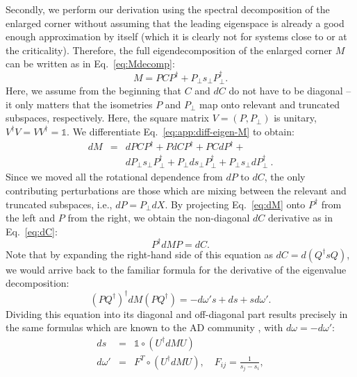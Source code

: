 \documentclass[twocolumn,floatfix,superscriptaddress,longbibliography,pra]{revtex4-2}
\begin{document}
Secondly, we perform our derivation using the spectral decomposition of the enlarged corner without assuming that the leading eigenspace is already a good enough approximation by itself (which it is clearly not for systems close to or at the criticality). Therefore, the full eigendecomposition of the enlarged corner $M$ can be written as in Eq.~\eqref{eq:Mdecomp}:
\begin{equation}
\label{eq:app:diff-eigen-M}
    M = PCP^\dagger + P_\perp s_\perp P_\perp^\dagger.
\end{equation}
Here, we assume from the beginning that $C$ and $dC$ do not have to be diagonal -- it only matters that the isometries $P$ and $P_\perp$ map onto relevant and truncated subspaces, respectively. Here, the square matrix $V=(P,P_\perp)$ is unitary, $V^\dagger V = V V^\dagger = \mathbb{1}$. We differentiate Eq.~\eqref{eq:app:diff-eigen-M} to obtain:
\begin{eqnarray}
    dM &=& dPCP^\dagger + PdCP^\dagger + PCdP^\dagger + \nonumber \\
        && dP_\perp s_\perp P_\perp^\dagger + P_\perp ds_\perp P_\perp^\dagger + P_\perp s_\perp dP_\perp^\dagger\ .
        \label{eq:dM}
\end{eqnarray}
 Since we moved all the rotational dependence from $dP$ to $dC$, the only contributing perturbations are those which are mixing between the relevant and truncated subspaces, i.e.,  $dP = P_\perp dX$.
By projecting Eq.~\eqref{eq:dM} onto $P^\dagger$ from the left and $P$ from the right, we obtain the non-diagonal $dC$ derivative as in Eq.~\eqref{eq:dC}:
\begin{equation}
    P^\dagger dM P = dC.
\end{equation}
Note that by expanding the right-hand side of this equation as $dC = d(Q^\dagger s Q)$, we would arrive back to the familiar formula for the derivative of the eigenvalue decomposition:
\begin{equation}
    (PQ^\dagger)^\dagger dM (PQ^\dagger) = -d\omega' s + ds + sd\omega'.
\end{equation}
Dividing this equation into its diagonal and off-diagonal part results precisely in the same formulas which are known to the AD community \cite{Matrix_derivatives}, with $d\omega=-d\omega'$:
\begin{eqnarray}
ds &=& \mathbb{1}\circ\left( U^\dagger dM U\right) \\
d\omega' &=& F^T\circ \left( U^\dagger dM U\right), \quad F_{ij} = \frac{1}{s_j-s_i},
\end{eqnarray}
\end{document}
